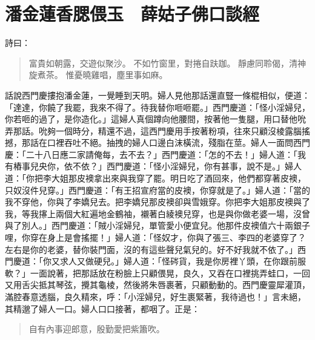 
\chapter{潘金蓮香腮偎玉　薛姑子佛口談經}

詩曰：
\begin{quote}
富貴如朝露，交遊似聚沙。
不如竹窗里，對捲自趺跏。
靜慮同聆偈，清神旋煮茶。
惟憂曉雞唱，塵里事如麻。
\end{quote}

話說西門慶摟抱潘金蓮，一覺睡到天明。婦人見他那話還直豎一條棍相似，便道：「達達，你饒了我罷，我來不得了。待我替你咂咂罷。」西門慶道：「怪小淫婦兒，你若咂的過了，是你造化。」這婦人真個蹲向他腰間，按著他一隻腿，用口替他吮弄那話。吮夠一個時分，精還不過，這西門慶用手按著粉項，往來只顧沒棱露腦搖撼，那話在口裡吞吐不絕。抽拽的婦人口邊白沫橫流，殘脂在莖。婦人一面問西門慶：「二十八日應二家請俺每，去不去？」西門慶道：「怎的不去！」婦人道：「我有樁事兒央你，依不依？」西門慶道：「怪小淫婦兒，你有甚事，說不是。」婦人道：「你把李大姐那皮襖拿出來與我穿了罷。明日吃了酒回來，他們都穿著皮襖，只奴沒件兒穿。」西門慶道：「有王招宣府當的皮襖，你穿就是了。」婦人道：「當的我不穿他，你與了李嬌兒去。把李嬌兒那皮襖卻與雪娥穿。你把李大姐那皮襖與了我，等我㩟上兩個大紅遍地金鶴袖，襯著白綾襖兒穿，也是與你做老婆一場，沒曾與了別人。」西門慶道：「賊小淫婦兒，單管愛小便宜兒。他那件皮襖值六十兩銀子哩，你穿在身上是會搖擺！」婦人道：「怪奴才，你與了張三、李四的老婆穿了？左右是你的老婆，替你裝門面，沒的有這些聲兒氣兒的。好不好我就不依了。」西門慶道：「你又求人又做硬兒。」婦人道：「怪硶貨，我是你房裡丫頭，在你跟前服軟？」一面說著，把那話放在粉臉上只顧偎晃，良久，又吞在口裡挑弄蛙口，一回又用舌尖抵其琴弦，攪其龜棱，然後將朱唇裹著，只顧動動的。西門慶靈犀灌頂，滿腔春意透腦，良久精來，呼：「小淫婦兒，好生裹緊著，我待過也！」言未絕，其精邈了婦人一口。婦人口口接著，都咽了。正是：
\begin{quote}
自有內事迎郎意，殷勤愛把紫簫吹。
\end{quote}

